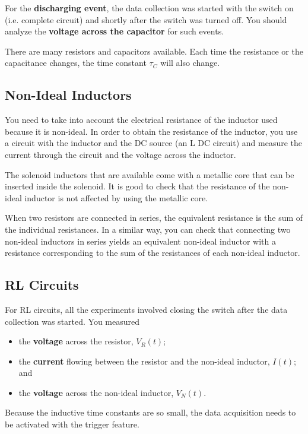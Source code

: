 For the \textbf{discharging event}, the data collection was started with the switch on (i.e. complete circuit) and shortly after the switch was turned off. You should analyze the \textbf{voltage across the capacitor} for such events.

There are many resistors and capacitors available. Each time the resistance or the capacitance changes, the time constant $\tau_{C}$ will also change.
\subsection{Non-Ideal Inductors}
You need to take into account the electrical resistance of the inductor used because it is non-ideal. In order to obtain the resistance of the inductor, you use a circuit with the inductor and the DC source (an L DC circuit) and measure the current through the circuit and the voltage across the inductor.

The solenoid inductors that are available come with a metallic core that can be inserted inside the solenoid. It is good to check that the resistance of the non-ideal inductor is not affected by using the metallic core.

When two resistors are connected in series, the equivalent resistance is the sum of the individual resistances. In a similar way, you can check that connecting two non-ideal inductors in series yields an equivalent non-ideal inductor with a resistance corresponding to the sum of the resistances of each non-ideal inductor.
\subsection{RL Circuits}
For RL circuits, all the experiments involved closing the switch after the data collection was started. You measured
\begin{itemize}
    \item the \textbf{voltage} across the resistor, $V_{R}(t)$;
    \item the \textbf{current} flowing between the resistor and the non-ideal inductor, $I(t)$; and
    \item the \textbf{voltage} across the non-ideal inductor, $V_{N}(t)$.
\end{itemize}
Because the inductive time constants are so small, the data acquisition needs to be activated with the trigger feature.

